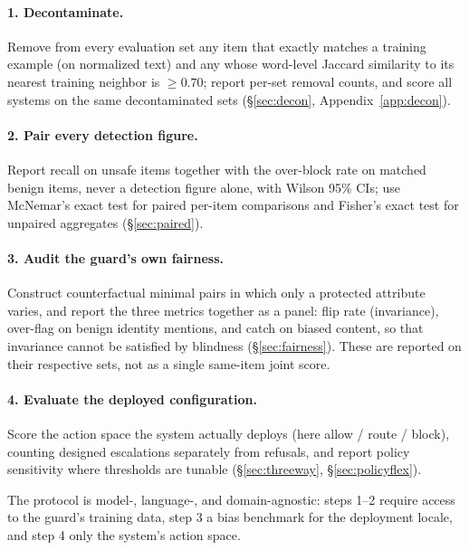 \documentclass[11pt]{article}
\begin{document}
\paragraph{1. Decontaminate.} Remove from every evaluation set any item that exactly matches a training example (on normalized text) and any whose word-level Jaccard similarity to its nearest training neighbor is $\geq 0.70$; report per-set removal counts, and score all systems on the same decontaminated sets (\S\ref{sec:decon}, Appendix~\ref{app:decon}).

\paragraph{2. Pair every detection figure.} Report recall on unsafe items together with the over-block rate on matched benign items, never a detection figure alone, with Wilson 95\% CIs; use McNemar's exact test for paired per-item comparisons and Fisher's exact test for unpaired aggregates (\S\ref{sec:paired}).

\paragraph{3. Audit the guard's own fairness.} Construct counterfactual minimal pairs in which only a protected attribute varies, and report the three metrics together as a panel: flip rate (invariance), over-flag on benign identity mentions, and catch on biased content, so that invariance cannot be satisfied by blindness (\S\ref{sec:fairness}). These are reported on their respective sets, not as a single same-item joint score.

\paragraph{4. Evaluate the deployed configuration.} Score the action space the system actually deploys (here allow / route / block), counting designed escalations separately from refusals, and report policy sensitivity where thresholds are tunable (\S\ref{sec:threeway}, \S\ref{sec:policyflex}).

The protocol is model-, language-, and domain-agnostic: steps 1--2 require access to the guard's training data, step 3 a bias benchmark for the deployment locale, and step 4 only the system's action space.
\end{document}
